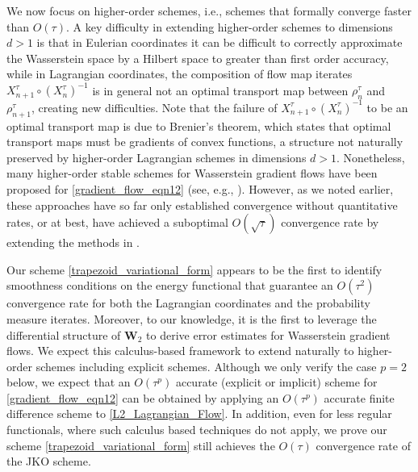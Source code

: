 \documentclass[11pt,a4paper]{amsart}
\newcommand{\1}{\mathds{1}}
\numberwithin{equation}{section}
\begin{document}
We now focus on higher-order schemes, i.e., schemes that formally converge faster than $O(\tau)$. A key difficulty in extending higher-order schemes to dimensions $d > 1$ is that in Eulerian coordinates it can be difficult to correctly approximate the Wasserstein space by a Hilbert space to greater than first order accuracy, while in Lagrangian coordinates, the composition of flow map iterates $X_{n+1}^{\tau}\circ (X_{n}^{\tau})^{-1}$ is in general not an optimal transport map between $\rho_n^{\tau}$ and $\rho_{n+1}^{\tau}$, creating new difficulties. Note that the failure of $X_{n+1}^{\tau}\circ (X_{n}^{\tau})^{-1}$ to be an optimal transport map is due to Brenier’s theorem, which states that optimal transport maps must be gradients of convex functions, a structure not naturally preserved by higher-order Lagrangian schemes in dimensions $d>1$.
Nonetheless, many higher-order stable schemes for Wasserstein gradient flows have been proposed for \eqref{gradient_flow_eqn12} (see, e.g., \cite{legendre2017second, matthes2019variational, ashworth2020structure,  zaitzeff_hos, carrillo2022primal, han_hos, gallouet2024geodesic, cances2024discretizing}). However, as we noted earlier, these approaches have so far only established convergence without quantitative rates, or at best, have achieved a suboptimal $O(\sqrt{\tau})$ convergence rate by extending the methods in \cite{ambrosio2005gradient}.

\smallskip

Our scheme \eqref{trapezoid_variational_form} appears to be the first to identify smoothness conditions on the energy functional that guarantee an $O(\tau^2)$ convergence rate for both the Lagrangian coordinates and the probability measure iterates. Moreover, to our knowledge, it is the first to leverage the differential structure of $\mathbf{W}_2$ to derive error estimates for Wasserstein gradient flows. We expect this calculus-based framework to extend naturally to higher-order schemes including explicit schemes. Although we only verify the case $p=2$ below, we expect that an $O(\tau^p)$ accurate (explicit or implicit) scheme for \eqref{gradient_flow_eqn12} can be obtained by applying an $O(\tau^p)$ accurate finite difference scheme to \eqref{L2_Lagrangian_Flow}. In addition, even for less regular functionals, where such calculus based techniques do not apply, we  prove our scheme \eqref{trapezoid_variational_form} still achieves the $O(\tau)$ convergence rate of the JKO scheme.


\smallskip
\end{document}
